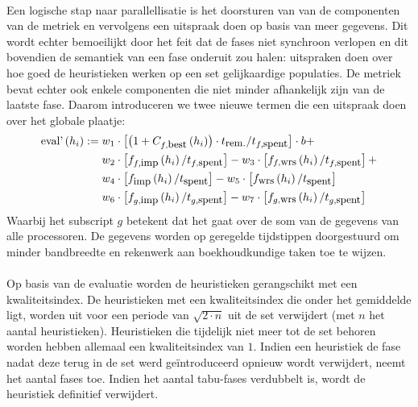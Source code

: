 \paragraph{}
Een logische stap naar parallellisatie is het doorsturen van van de componenten van de metriek en vervolgens een uitspraak doen op basis van meer gegevens. Dit wordt echter bemoeilijkt door het feit dat de fases niet synchroon verlopen en dit bovendien de semantiek van een fase onderuit zou halen: uitspraken doen over hoe goed de heuristieken werken op een set gelijkaardige populaties. De metriek bevat echter ook enkele componenten die niet minder afhankelijk zijn van de laatste fase. Daarom introduceren we twee nieuwe termen die een uitspraak doen over het globale plaatje:
\begin{align*}
\mbox{eval'}\left(h_i\right):={}&w_1\cdot\left[\left(1+C_{f,\mbox{\small{best}}}\left(h_i\right)\right)\cdot t_{\mbox{\small{rem.}}}/t_{f,\mbox{\small{spent}}}\right]\cdot b+\\
&w_2\cdot\left[f_{f,\mbox{\small{imp}}}\left(h_i\right)/t_{f,\mbox{\small{spent}}}\right]-w_3\cdot\left[f_{f,\mbox{\small{wrs}}}\left(h_i\right)/t_{f,\mbox{\small{spent}}}\right]+\\
&w_4\cdot\left[f_{\mbox{\small{imp}}}\left(h_i\right)/t_{\mbox{\small{spent}}}\right]-w_5\cdot\left[f_{\mbox{\small{wrs}}}\left(h_i\right)/t_{\mbox{\small{spent}}}\right]\\
&w_6\cdot\left[f_{g,\mbox{\small{imp}}}\left(h_i\right)/t_{g,\mbox{\small{spent}}}\right]-w_7\cdot\left[f_{g,\mbox{\small{wrs}}}\left(h_i\right)/t_{g,\mbox{\small{spent}}}\right]
\end{align*}
Waarbij het subscript $g$ betekent dat het gaat over de som van de gegevens van alle processoren. De gegevens worden op geregelde tijdstippen doorgestuurd om minder bandbreedte en rekenwerk aan boekhoudkundige taken toe te wijzen.

\paragraph{}
Op basis van de evaluatie worden de heuristieken gerangschikt met een kwaliteitsindex. De heuristieken met een kwaliteitsindex die onder het gemiddelde ligt, worden uit voor een periode van $\sqrt{2\cdot n}$ uit de set verwijdert (met $n$ het aantal heuristieken). Heuristieken die tijdelijk niet meer tot de set behoren worden hebben allemaal een kwaliteitsindex van $1$. Indien een heuristiek de fase nadat deze terug in de set werd ge\"introduceerd opnieuw wordt verwijdert, neemt het aantal fases toe. Indien het aantal tabu-fases verdubbelt is, wordt de heuristiek definitief verwijdert.
